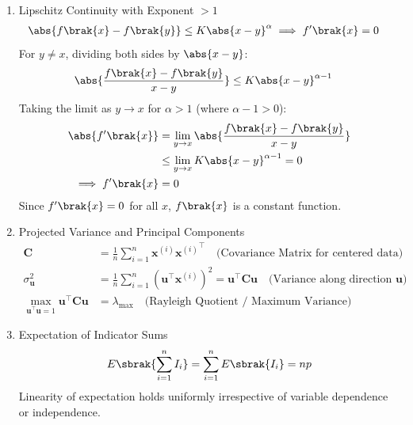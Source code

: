 \begin{enumerate}[label=\thesubsection.\arabic*, ref=\thesubsection.\theenumi]
	\item Lipschitz Continuity with Exponent $> 1$
	\begin{align}
		\abs{f\brak{x} - f\brak{y}} &\le K \abs{x - y}^\alpha \implies f'\brak{x} = 0 \label{eq:DA2025-lipschitz}
	\end{align}
	\solution
	For $y \ne x$, dividing both sides by $\abs{x - y}$:
	\begin{align}
		\abs{\frac{f\brak{x} - f\brak{y}}{x - y}} &\le K \abs{x - y}^{\alpha - 1}
	\end{align}
	Taking the limit as $y \to x$ for $\alpha > 1$ (where $\alpha - 1 > 0$):
	\begin{align}
		\abs{f'\brak{x}} &= \lim_{y \to x} \abs{\frac{f\brak{x} - f\brak{y}}{x - y}}
		\\
		&\le \lim_{y \to x} K \abs{x - y}^{\alpha - 1} = 0
		\\
		\implies f'\brak{x} &= 0
	\end{align}
	Since $f'\brak{x} = 0$ for all $x$, $f\brak{x}$ is a constant function.
	
	\item Projected Variance and Principal Components
	\begin{align}
		\mathbf{C} &= \frac{1}{n} \sum_{i=1}^n \mathbf{x}^{(i)} {\mathbf{x}^{(i)}}^\top \quad \text{(Covariance Matrix for centered data)} \label{eq:DA2025-cov_centered}
		\\
		\sigma_{\mathbf{u}}^2 &= \frac{1}{n} \sum_{i=1}^n \left(\mathbf{u}^\top \mathbf{x}^{(i)}\right)^2 = \mathbf{u}^\top \mathbf{C} \mathbf{u} \quad \text{(Variance along direction $\mathbf{u}$)} \label{eq:DA2025-proj_variance}
		\\
		\max_{\mathbf{u}^\top \mathbf{u} = 1} \mathbf{u}^\top \mathbf{C} \mathbf{u} &= \lambda_{\max} \quad \text{(Rayleigh Quotient / Maximum Variance)} \label{eq:DA2025-pca_max_var}
	\end{align}
	
	\item Expectation of Indicator Sums
	\begin{align}
		E\sbrak{\sum_{i=1}^n I_i} = \sum_{i=1}^n E\sbrak{I_i} = np \label{eq:DA2025-linearity}
	\end{align}
	Linearity of expectation holds uniformly irrespective of variable dependence or independence.
	

\end{enumerate}
